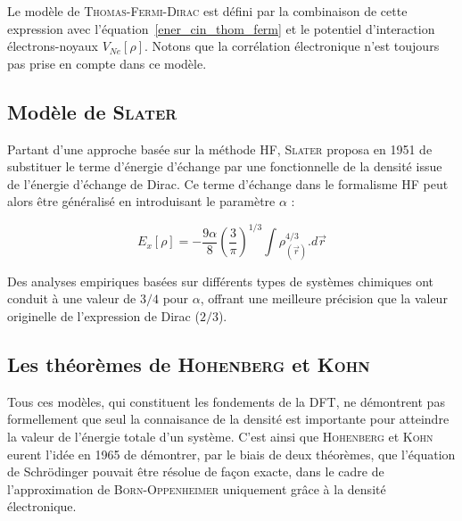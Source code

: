 Le modèle de \textsc{Thomas-Fermi-Dirac} est défini par la combinaison de cette expression avec l'équation~\ref{ener_cin_thom_ferm} et le potentiel d'interaction électrons-noyaux $V_{Ne}[\rho]$. Notons que la corrélation électronique n'est toujours pas prise en compte dans ce modèle.


\subsection{Modèle de \textsc{Slater}}

Partant d'une approche basée sur la méthode HF, \textsc{Slater} proposa en 1951 de substituer le terme d'énergie d'échange par une fonctionnelle de la densité issue de l'énergie d'échange de Dirac. Ce terme d'échange dans le formalisme HF peut alors être généralisé en introduisant le paramètre $\alpha$ :

\begin{equation}
E_{x}[\rho] = - \frac{9\alpha}{8} \left(\frac{3}{\pi}\right)^{1/3} \int \rho_{(\vec{r})}^{4/3} .d\vec{r}
\end{equation}

Des analyses empiriques basées sur différents types de systèmes chimiques ont conduit à une valeur de $3/4$ pour $\alpha$, offrant une meilleure précision que la valeur originelle de l'expression de Dirac ($2/3$).

\subsection{Les théorèmes de \textsc{Hohenberg} et \textsc{Kohn}}

Tous ces modèles, qui constituent les fondements de la DFT, ne démontrent pas formellement que seul la connaisance de la densité est importante pour atteindre la valeur de l'énergie totale d'un système. C'est ainsi que \textsc{Hohenberg} et \textsc{Kohn} eurent l'idée en 1965 de démontrer, par le biais de deux théorèmes, que l'équation de Schr\"{o}dinger pouvait être résolue de façon exacte, dans le cadre de l'approximation de \textsc{Born-Oppenheimer} uniquement grâce à la densité électronique.

